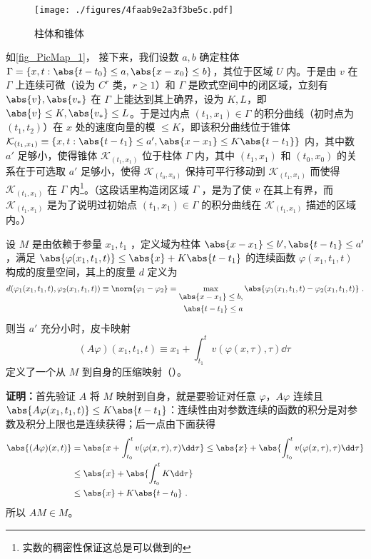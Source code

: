 \begin{figure}[ht]
\centering
\texttt{[image: ./figures/4faab9e2a3f3be5c.pdf]}
\caption{柱体和锥体} \label{fig_PicMap_1}
\end{figure}
如\autoref{fig_PicMap_1}， 接下来，我们设数 $a,b$ 确定柱体 $\Gamma=\{x,t:\abs{t-t_0}\leq a,\abs{x-x_0}\leq b\}$，其位于区域 $U$ 内。于是由 $v$ 在 $\Gamma$ 上连续可微（设为 $C^r$ 类，$r\geq1$）和 $\Gamma$ 是欧式空间中的闭区域，立刻有 $\abs{v},\abs{v_*}$ 在 $\Gamma$ 上能达到其上确界，设为 $K,L$，即 $\abs{v}\leq K,\abs{v_*}\leq L$。于是过内点 $(t_1,x_1)\in\Gamma$ 的积分曲线（初时点为 $(t_1,t_2)$）在 $x$ 处的速度向量的模 $\leq K$，即该积分曲线位于锥体 $\mathcal K_{(t_1,x_1)}\equiv\{x,t:\abs{t-t_1}\leq a',\abs{x-x_1}\leq K\abs{t-t_1}\}$ 内，其中数 $a'$ 足够小，使得锥体 $\mathcal K_{(t_1,x_1)}$ 位于柱体 $\Gamma$ 内，其中 $(t_1,x_1)$ 和 $(t_0,x_0)$ 的关系在于可选取 $a'$ 足够小，使得 $\mathcal K_{(t_0,x_0)}$ 保持可平行移动到 $\mathcal K_{(t_1,x_1)}$ 而使得 $\mathcal K_{(t_1,x_1)}$ 在 $\Gamma$ 内\footnote{实数的稠密性保证这总是可以做到的}。（这段话里构造闭区域 $\Gamma$ ，是为了使 $v$ 在其上有界，而 $\mathcal K_{(t_1,x_1)}$ 是为了说明过初始点 $(t_1,x_1)\in\Gamma$ 的积分曲线在 $\mathcal K_{(t_1,x_1)}$ 描述的区域内。）

\begin{theorem}{}\label{the_PicMap_2}
设 $M$ 是由依赖于参量 $x_1,t_1$ ，定义域为柱体 $\abs{x-x_1}\leq b',\abs{t-t_1}\leq a'$，满足 $\abs{\varphi(x_1,t_1,t)}\leq \abs{x}+K\abs{t-t_1}$ 的连续函数 $\varphi(x_1,t_1,t)$ 构成的度量空间，其上的度量 $d$ 定义为
\begin{equation}
d(\varphi_1(x_1,t_1,t),\varphi_2(x_1,t_1,t))\equiv\norm{\varphi_1-\varphi_2}=\max_{\begin{aligned}\abs{x-x_1}\leq b,\\\abs{t-t_1}\leq a\end{aligned}}\abs{\varphi_1(x_1,t_1,t)-\varphi_2(x_1,t_1,t)}~.
\end{equation}
则当 $a'$ 充分小时，皮卡映射
\begin{equation}
(A\varphi)(x_1,t_1,t)\equiv x_1+\int_{t_1}^{t}v(\varphi(x,\tau),\tau)\dd \tau~
\end{equation}
定义了一个从 $M$ 到自身的压缩映射（）。
\end{theorem}
\textbf{证明：}首先验证 $A$ 将 $M$ 映射到自身，就是要验证对任意 $\varphi$，$A\varphi$ 连续且 $\abs{A\varphi(x_1,t_1,t)}\leq K\abs{t-t_1}$：连续性由对参数连续的函数的积分是对参数及积分上限也是连续获得；后一点由下面获得
\begin{equation}
\begin{aligned}
\abs{(A\varphi)(x,t)}&=\abs{x+\int_{t_0}^t v(\varphi(x,\tau),\tau)\dd \tau}\leq\abs{x}+\abs{\int_{t_0}^t v(\varphi(x,\tau),\tau)\dd \tau}\\
&\leq\abs{x}+\abs{\int_{t_0}^t K\dd \tau}\\
&\leq\abs{x}+K\abs{t-t_0}~.
\end{aligned}
\end{equation}
所以 $AM\in M$。

